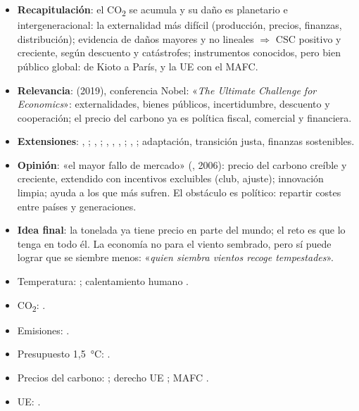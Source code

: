 \documentclass{article}
\begin{document}
\begin{columnas}
\begin{itemize}
\item \textbf{Recapitulación}: el CO\textsubscript{2} se acumula y su daño es planetario e intergeneracional: la externalidad más difícil (producción, precios, finanzas, distribución); evidencia de daños mayores y no lineales $\Rightarrow$ CSC positivo y creciente, según descuento y catástrofes; instrumentos conocidos, pero bien público global: de Kioto a París, y la UE con el MAFC.
\item \textbf{Relevancia}:  (2019), conferencia Nobel: «\emph{The Ultimate Challenge for Economics}»: externalidades, bienes públicos, incertidumbre, descuento y cooperación; el precio del carbono ya es política fiscal, comercial y financiera.
\item \textbf{Extensiones}: , ; , ; , , , ; , ; adaptación, transición justa, finanzas sostenibles.
\item \textbf{Opinión}: «el mayor fallo de mercado» (, 2006): precio del carbono creíble y creciente, extendido con incentivos excluibles (club, ajuste); innovación limpia; ayuda a los que más sufren. El obstáculo es político: repartir costes entre países y generaciones.
\item \textbf{Idea final}: la tonelada ya tiene precio en parte del mundo; el reto es que lo tenga en todo él. La economía no para el viento sembrado, pero sí puede lograr que se siembre menos: «\emph{quien siembra vientos recoge tempestades}».
\end{itemize}

\anexorepaso
{}
\begin{itemize}
\item Temperatura: ; calentamiento humano .
\item CO\textsubscript{2}: .
\item Emisiones: .
\item Presupuesto 1,5~°C: .
\item Precios del carbono: ; derecho UE ; MAFC .
\item UE: .
\end{itemize}


\end{columnas}
\end{document}
